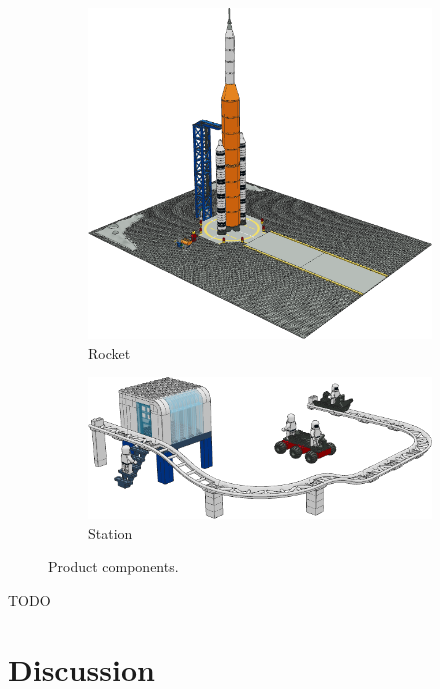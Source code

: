\documentclass{PDS}
\begin{document}
\begin{figure}[htbp]
    \begin{subfigure}[b]{0.3\textwidth}
        \includegraphics[width=\textwidth]{./figures/space_rocket.png}
        \caption{Rocket}
    \end{subfigure}
    \hfill
    \begin{subfigure}[b]{0.65\textwidth}
        \includegraphics[width=\textwidth]{./figures/space_station.png}
        \caption{Station}
    \end{subfigure}
    \caption{Product components.}
\end{figure}

TODO

\section{Discussion}
\label{sec:discussion}
\end{document}
